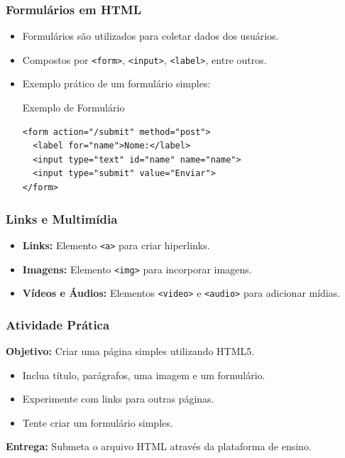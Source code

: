 \begin{frame}[fragile]
  \frametitle{Formulários em HTML}
  \begin{itemize}
    \item Formulários são utilizados para coletar dados dos usuários.
    \item Compostos por \texttt{<form>}, \texttt{<input>}, \texttt{<label>}, entre outros.
    \item Exemplo prático de um formulário simples:
    \begin{block}{Exemplo de Formulário}
    \begin{verbatim}
<form action="/submit" method="post">
  <label for="name">Nome:</label>
  <input type="text" id="name" name="name">
  <input type="submit" value="Enviar">
</form>
    \end{verbatim}
    \end{block}
  \end{itemize}
\end{frame}

\begin{frame}[fragile]
  \frametitle{Links e Multimídia}
  \begin{itemize}
    \item \textbf{Links:} Elemento \texttt{<a>} para criar hiperlinks.
    \item \textbf{Imagens:} Elemento \texttt{<img>} para incorporar imagens.
    \item \textbf{Vídeos e Áudios:} Elementos \texttt{<video>} e \texttt{<audio>} para adicionar mídias.
  \end{itemize}
\end{frame}

\begin{frame}[fragile]
  \frametitle{Atividade Prática}
  \textbf{Objetivo:} Criar uma página simples utilizando HTML5.
  \begin{itemize}
    \item Inclua título, parágrafos, uma imagem e um formulário.
    \item Experimente com links para outras páginas.
    \item Tente criar um formulário simples.
  \end{itemize}
  \textbf{Entrega:} Submeta o arquivo HTML através da plataforma de ensino.
\end{frame}

